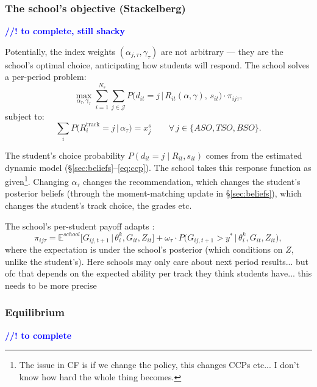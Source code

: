 \documentclass{article}
\begin{document}
\subsubsection{The school's objective (Stackelberg)}
\textcolor{blue}{\textbf{//! to complete, still shacky}}

Potentially, the index weights $(\alpha_{j,\tau}, \gamma_\tau)$ are not arbitrary --- they are the school's optimal choice, anticipating how students will respond. The school solves a per-period problem:
\begin{equation}
  \max_{\alpha_\tau, \gamma_\tau} \sum_{i=1}^{N_s} \sum_{j \in \mathcal{J}} P\!\big(d_{it} = j \,\big|\, R_{it}(\alpha, \gamma),\, s_{it}\big) \cdot \pi_{ij\tau},
  \label{eq:school_obj}
\end{equation}
subject to:
\begin{equation}
  \sum_{i} P\!\big(R_i^{\mathrm{track}} = j \,\big|\, \alpha_\tau\big) = x_j^s \qquad \forall\, j \in \{ASO, TSO, BSO\}.
  \label{eq:cap_constraint}
\end{equation}

The student's choice probability $P(d_{it} = j \mid R_{it}, s_{it})$ comes from the estimated dynamic model (\S\ref{sec:beliefs}--\ref{eq:ccp}). The school takes this response function as given\footnote{The issue in CF is if we change the policy, this changes CCPs etc... I don't know how hard the whole thing becomes.}. Changing $\alpha_\tau$ changes the recommendation, which changes the student's posterior beliefs (through the moment-matching update in \S\ref{sec:beliefs}), which changes the student's track choice, the grades etc.

The school's per-student payoff adapts \citet{fu_mehta}:
\begin{equation}
  \pi_{ij\tau} = \mathbb{E}^{school}\!\big[G_{ij,t+1} \,\big|\, \theta^k_i, G_{it}, Z_{it}\big] + \omega_\tau \cdot P\!\big(G_{ij,t+1} > y^* \,\big|\, \theta^k_i, G_{it}, Z_{it}\big),
  \label{eq:school_payoff}
\end{equation}
where the expectation is under the school's posterior (which conditions on $Z$, unlike the student's). Here schools may only care about next period results... but ofc that depends on the expected ability per track they think students have... this needs to be more precise


\subsubsection{Equilibrium}
\textcolor{blue}{\textbf{//! to complete}}
\end{document}
